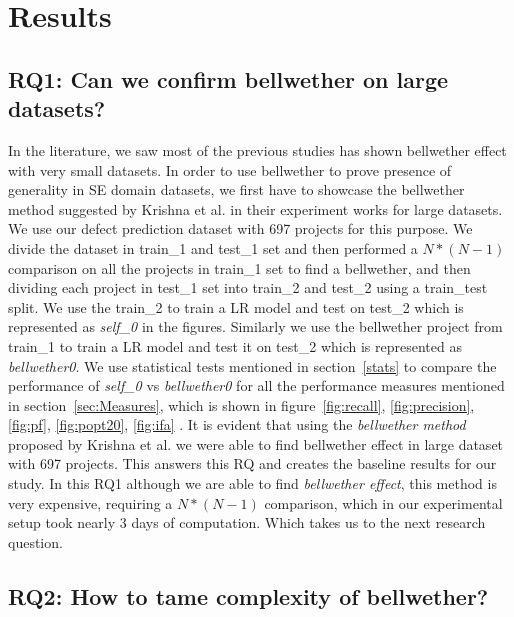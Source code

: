 \documentclass[sigconf,review]{acmart}
\theoremstyle{break}
\begin{document}
\section{Results}
\label{sec:results}



\subsection{RQ1: Can we confirm bellwether on large datasets?}
\label{sec:rq1}

In the literature, we saw most of the previous studies has shown bellwether effect with very small datasets. In order to use bellwether to prove presence of generality in SE domain datasets, we first have to showcase the bellwether method suggested by Krishna et al. in their experiment works for large datasets. We use our defect prediction dataset with 697 projects for this purpose. We divide the dataset in train\_1 and test\_1 set and then performed a $ N*(N-1) $ comparison on all the projects in train\_1 set to find a bellwether, and then dividing each project in test\_1 set into train\_2 and test\_2 using a train\_test split. We use the train\_2 to train a LR model and test on test\_2 which is represented as \textit{self\_0} in the figures. Similarly we use the bellwether project from train\_1 to train a LR model and test it on test\_2 which is represented as \textit{bellwether0}. We use statistical tests mentioned in section~\ref{stats} to compare the performance of \textit{self\_0} vs \textit{bellwether0} for all the performance measures mentioned in section~\ref{sec:Measures}, which is shown in figure~\ref{fig:recall}, \ref{fig:precision}, \ref{fig:pf}, \ref{fig:popt20}, \ref{fig:ifa} . It is evident that using the \textit{bellwether method} proposed by Krishna et al. we were able to find bellwether effect in large dataset with 697 projects. This answers this RQ and creates the baseline results for our study. In this RQ1 although we are able to find \textit{bellwether effect}, this method is very expensive, requiring a $ N*(N-1) $ comparison, which in our experimental setup took nearly 3 days of computation. Which takes us to the next research question. 



\subsection{RQ2: How to tame complexity of bellwether?}
\label{sec:rq2}
\end{document}
